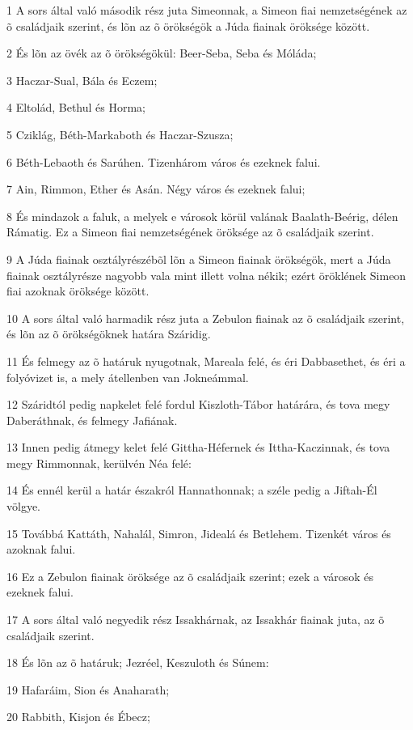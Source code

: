 \par 1 A sors által való második rész juta Simeonnak, a Simeon fiai nemzetségének az õ családjaik szerint, és lõn az õ örökségök a Júda fiainak öröksége között.
\par 2 És lõn az övék az õ örökségökül: Beer-Seba, Seba és Móláda;
\par 3 Haczar-Sual, Bála és Eczem;
\par 4 Eltolád, Bethul és Horma;
\par 5 Cziklág, Béth-Markaboth és Haczar-Szusza;
\par 6 Béth-Lebaoth és Sarúhen. Tizenhárom város és ezeknek falui.
\par 7 Ain, Rimmon, Ether és Asán. Négy város és ezeknek falui;
\par 8 És mindazok a faluk, a melyek e városok körül valának Baalath-Beérig, délen Rámatig. Ez a Simeon fiai nemzetségének öröksége az õ családjaik szerint.
\par 9 A Júda fiainak osztályrészébõl lõn a Simeon fiainak örökségök, mert a Júda fiainak osztályrésze nagyobb vala mint illett volna nékik; ezért öröklének Simeon fiai azoknak öröksége között.
\par 10 A sors által való harmadik rész juta a Zebulon fiainak az õ családjaik szerint, és lõn az õ örökségöknek határa Száridig.
\par 11 És felmegy az õ határuk nyugotnak, Mareala felé, és éri Dabbasethet, és éri a folyóvizet is, a mely átellenben van Jokneámmal.
\par 12 Száridtól pedig napkelet felé fordul Kiszloth-Tábor határára, és tova megy Daberáthnak, és felmegy Jafiának.
\par 13 Innen pedig átmegy kelet felé Gittha-Héfernek és Ittha-Kaczinnak, és tova megy Rimmonnak, kerülvén Néa felé:
\par 14 És ennél kerül a határ északról Hannathonnak; a széle pedig a Jiftah-Él völgye.
\par 15 Továbbá Kattáth, Nahalál, Simron, Jidealá és Betlehem. Tizenkét város és azoknak falui.
\par 16 Ez a Zebulon fiainak öröksége az õ családjaik szerint; ezek a városok és ezeknek falui.
\par 17 A sors által való negyedik rész Issakhárnak, az Issakhár fiainak juta, az õ családjaik szerint.
\par 18 És lõn az õ határuk; Jezréel, Keszuloth és Súnem:
\par 19 Hafaráim, Sion és Anaharath;
\par 20 Rabbith, Kisjon és Ébecz;
